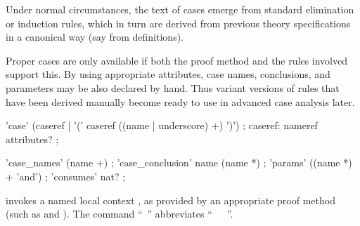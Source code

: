 \begin{isabellebody}
\begin{isamarkuptext}
  Under normal circumstances, the text of cases emerge from standard
  elimination or induction rules, which in turn are derived from
  previous theory specifications in a canonical way (say from
  \hyperlink{command.inductive}{\mbox{}} definitions).

  \medskip Proper cases are only available if both the proof method
  and the rules involved support this.  By using appropriate
  attributes, case names, conclusions, and parameters may be also
  declared by hand.  Thus variant versions of rules that have been
  derived manually become ready to use in advanced case analysis
  later.

  \begin{rail}
    'case' (caseref | '(' caseref ((name | underscore) +) ')')
    ;
    caseref: nameref attributes?
    ;

    'case\_names' (name +)
    ;
    'case\_conclusion' name (name *)
    ;
    'params' ((name *) + 'and')
    ;
    'consumes' nat?
    ;
  \end{rail}

  \begin{descr}
  
  \item [\hyperlink{command.case}{\mbox{\isa{\isacommand{case}}}}~\isa{{\isachardoublequote}{\isacharparenleft}c\ x\isactrlsub {\isadigit{1}}\ {\isasymdots}\ x\isactrlsub m{\isacharparenright}{\isachardoublequote}}]
  invokes a named local context , as provided by an appropriate
  proof method (such as \hyperlink{method.cases}{\mbox{}} and \hyperlink{method.induct}{\mbox{}}).
  The command ``\hyperlink{command.case}{\mbox{}}~'' abbreviates ``\hyperlink{command.fix}{\mbox{}}~~\hyperlink{command.assume}{\mbox{}}~''.


\end{descr}
\end{isamarkuptext}
\end{isabellebody}
